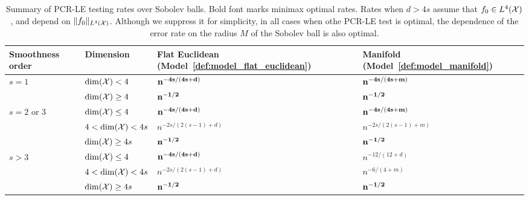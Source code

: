 \begin{table}[p]
	\begin{center}
		\begin{tabular}{p{} p{} | p{} p{} }
			Smoothness order & Dimension & Flat Euclidean (Model~\ref{def:model_flat_euclidean}) & Manifold (Model~\ref{def:model_manifold}) \\
			\hline
			\multirow{2}{*}{$s = 1$} & $\dim(\mathcal{X}) < 4$ & ${\bf n^{-4s/(4s + d)}}$ & ${\bf n^{-4s/(4s + m)}}$ \\
			& $\dim(\mathcal{X}) \geq 4$ & ${\bf n^{-1/2}}$ & ${\bf n^{-1/2}}$ \\
			\hline
			\multirow{3}{*}{$s = 2$ or $3$} & $\dim(\mathcal{X}) \leq 4$  & ${\bf n^{-4s/(4s + d)}}$ & ${\bf n^{-4s/(4s + m)}}$ \\
			& $4 <\dim(\mathcal{X}) < 4s$  & $n^{-2s/(2(s - 1) + d)}$ & $n^{-2s/(2(s - 1) + m)}$\\
			& $\dim(\mathcal{X}) \geq 4s$ & ${\bf n^{-1/2}}$ & ${\bf n^{-1/2}}$ \\
			\hline
			\multirow{3}{*}{$s > 3$} & $\dim(\mathcal{X}) \leq 4$ & ${\bf n^{-4s/(4s + d)}}$ & $n^{-12/(12 + d)}$ \\
			& $4 < \dim(\mathcal{X}) < 4s$ & $n^{-2s/(2(s - 1) + d)}$ & $n^{-6/(4 + m)}$ \\
			& $\dim(\mathcal{X}) \geq 4s$ & ${\bf n^{-1/2}}$ & ${\bf n^{-1/2}}$ \\
		\end{tabular}
	\end{center}
	\caption{Summary of PCR-LE testing rates over Sobolev balls. Bold font marks minimax optimal rates. Rates when $d > 4s$ assume that $f_0 \in L^4(\mathcal{X})$, and depend on $\|f_0\|_{L^4(\mathcal{X})}$. Although we suppress it for simplicity, in all cases when othe PCR-LE test is optimal, the dependence of the error rate on the radius $M$ of the Sobolev ball is also optimal.}
	\label{tbl:testing_rates}
\end{table}

